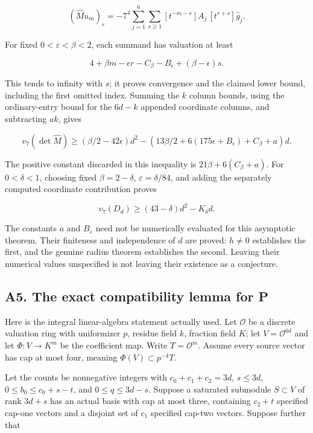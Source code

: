 \documentclass[11pt,a4paper]{article}
\begin{document}
\[
(\widehat M u_m)_r=-7^4\sum_{j=1}^6\sum_{s\ge1}
[t^{-m-s}]A_j\,[t^{r+s}]\widehat g_j.
\]

For fixed \(0<ε<β<2\), each summand has valuation at least

\[
4+\beta m-\epsilon r-C_\beta-B_\epsilon+(\beta-\epsilon)s.
\]

This tends to infinity with \(s\); it proves convergence and the claimed lower bound, including the first omitted index. Summing the \(k\) column bounds, using the ordinary-entry bound for the \(6d-k\) appended coordinate columns, and subtracting \(ak\), gives

\[
v_7(\det\widehat M)
\ge(\beta/2-42\epsilon)d^2
-\left(13\beta/2+6(175\epsilon+B_\epsilon)+C_\beta+a\right)d.
\]

The positive constant discarded in this inequality is \(21β+6(C_β+a)\). For \(0<δ<1\), choosing fixed \(β=2-δ\), \(ε=δ/84\), and adding the separately computed coordinate contribution proves

\[
v_7(D_d)\ge(43-\delta)d^2-K_\delta d.
\]

The constants \(a\) and \(B_ε\) need not be numerically evaluated for this asymptotic theorem. Their finiteness and independence of \(d\) are proved: \(h≠0\) establishes the first, and the genuine radius theorem establishes the second. Leaving their numerical values unspecified is not leaving their existence as a conjecture.

\hypertarget{a5.-the-exact-compatibility-lemma-for-p}{%
\subsection{A5. The exact compatibility lemma for P}\label{a5.-the-exact-compatibility-lemma-for-p}}

Here is the integral linear-algebra statement actually used. Let \(\mathcal{O}\) be a discrete valuation ring with uniformizer \(p\), residue field \(k\), fraction field \(K\); let \(V=\mathcal{O}^{6d}\) and let \(Φ:V→K^m\) be the coefficient map. Write \(T=\mathcal{O}^m\). Assume every source vector has cap at most four, meaning \(Φ(V)⊂p^{-4}T\).

Let the counts be nonnegative integers with \(c_{0}+c_{1}+c_{2}=3d\), \(s≤3d\), \(0≤b_{0}≤c_{0}+s-t\), and \(0≤q≤3d-s\). Suppose a saturated submodule \(S⊂V\) of rank \(3d+s\) has an actual basis with cap at most three, containing \(c_{2}+t\) specified cap-one vectors and a disjoint set of \(c_{1}\) specified cap-two vectors. Suppose further that
\end{document}
